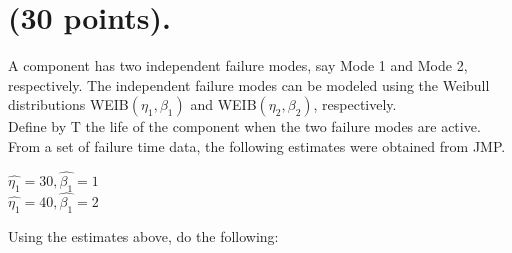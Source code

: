 \documentclass{article}
\begin{document}
\section{(30 points).}
A component has two independent failure modes, say Mode 1 and Mode 2, respectively.  The independent failure modes can be modeled using the Weibull distributions WEIB\((\eta_{1}, \beta_{1})\) and WEIB\((\eta_{2}, \beta_{2})\), respectively.\\

Define by T the life of the component when the two failure modes are active.  From a set of failure time data, the following estimates were obtained from JMP.\\

\begin{center}
\(\hat{\eta_{1}} = 30 , \hat{\beta_{1}} = 1 \)\\
\(\hat{\eta_{1}} = 40 , \hat{\beta_{1}} = 2 \)\\
\end{center}

Using the estimates above, do the following:
\end{document}
